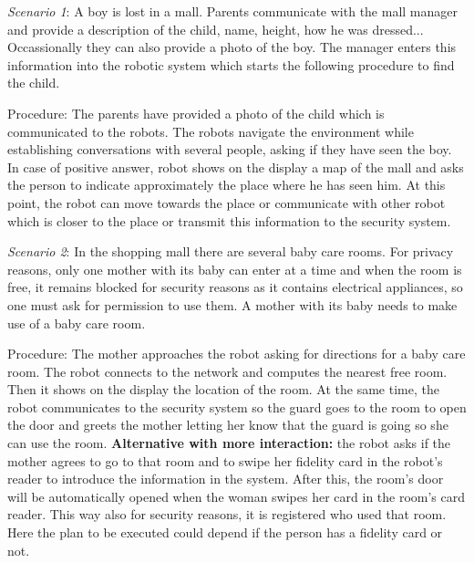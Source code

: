 \textit{Scenario 1}: 
A boy is lost in a mall. Parents communicate with the mall manager and provide a description of the child, name, height, how he was dressed... Occassionally they can also provide a photo of the boy. The manager enters this information into the robotic system which starts the following procedure to find the child.

Procedure: 
The parents have provided a photo of the child which is communicated to the robots. The robots navigate the environment while establishing conversations with several people, asking if they have seen the boy. In case of positive answer, robot shows on the display a map of the mall and asks the person to indicate approximately the place where he has seen him. At this point, the robot can move towards the place or communicate with other robot which is closer to the place or transmit this information to the security system.

\textit{Scenario 2}: 
In the shopping mall there are several baby care rooms. For privacy reasons, only one mother with its baby can enter at a time and when the room is free, it remains blocked for security reasons as it contains electrical appliances, so one must ask for permission to use them. 
A mother with its baby needs to make use of a baby care room.

Procedure: 
The mother approaches the robot asking for directions for a baby care room. The robot connects to the network and computes the nearest free room. Then it shows on the display the location of the room. At the same time, the robot communicates to the security system so the guard goes to the room to open the door and greets the mother letting her know that the guard is going so she can use the room. \textbf{Alternative with more interaction:} the robot asks if the mother agrees to go to that room and to swipe her fidelity card in the robot's reader to introduce the information in the system. After this, the room's door will be automatically opened when the woman swipes her card in the room's card reader. This way also for security reasons, it is registered who used that room.
{\color{blue} Here the plan to be executed could depend if the person has a fidelity card or not.}
